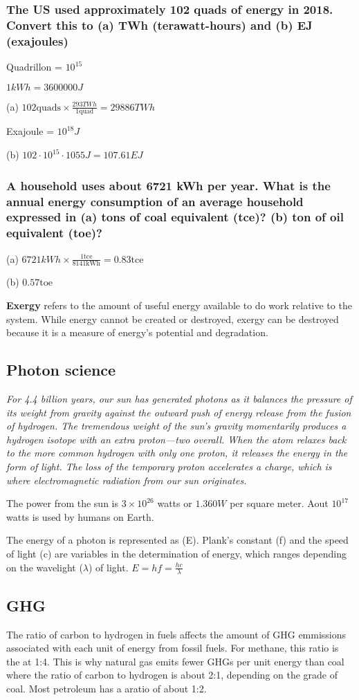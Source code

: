\subsubsection{The US used approximately 102 quads of energy in 2018. Convert
this to (a) TWh (terawatt-hours) and (b) EJ (exajoules)}
Quadrillon = $10^{15}$

$1 kWh = 3600000J$

(a) $102 \text{quads} \times \frac{293 TWh}{1 \text{quad}} = 29886 TWh$

Exajoule = $10^{18}J$

(b) $102 \cdot 10^{15} \cdot 1055J = 107.61 EJ$

\subsubsection{A household uses about 6721 kWh per year. What is the annual
energy consumption of an average household expressed in (a) tons of coal
equivalent (tce)? (b) ton of oil equivalent (toe)?}

(a) $6721 kWh \times \frac{1 \text{tce}}{8141 \text{kWh}} = 0.83\text{tce}$

(b) $0.57 \text{toe}$

\textbf{Exergy} refers to the amount of useful energy available to do work
relative to the system. While energy cannot be created or destroyed, exergy can
be destroyed because it is a measure of energy's potential and degradation.

\subsection{Photon science}

\textit{
For 4.4 billion years, our sun has generated photons as it balances the
pressure of its weight from gravity against the outward push of energy release
from the fusion of hydrogen. The tremendous weight of the sun’s gravity
momentarily produces a hydrogen isotope with an extra proton—two overall. When
the atom relaxes back to the more common hydrogen with only one proton, it
releases the energy in the form of light. The loss of the temporary proton
accelerates a charge, which is where electromagnetic radiation from our sun
originates.
}

The power from the sun is $3 \times 10^{26}$ watts or $1.360W$ per square
meter. Aout $10^{17}$ watts is used by humans on Earth.

The energy of a photon is represented as (E). Plank's constant (f) and the
speed of light (c) are variables in the determination of energy, which ranges
depending on the wavelight ($\lambda$) of light.
$E = hf = \frac{hc}{\lambda}$

\subsection{GHG}

The ratio of carbon to hydrogen in fuels affects the amount of GHG emmissions
associated with each unit of energy from fossil fuels. For methane, this ratio
is the at 1:4. This is why natural gas emits fewer GHGs per unit energy
than coal where the ratio of carbon to hydrogen is about 2:1, depending on the
grade of coal. Most petroleum has a aratio of about 1:2.
